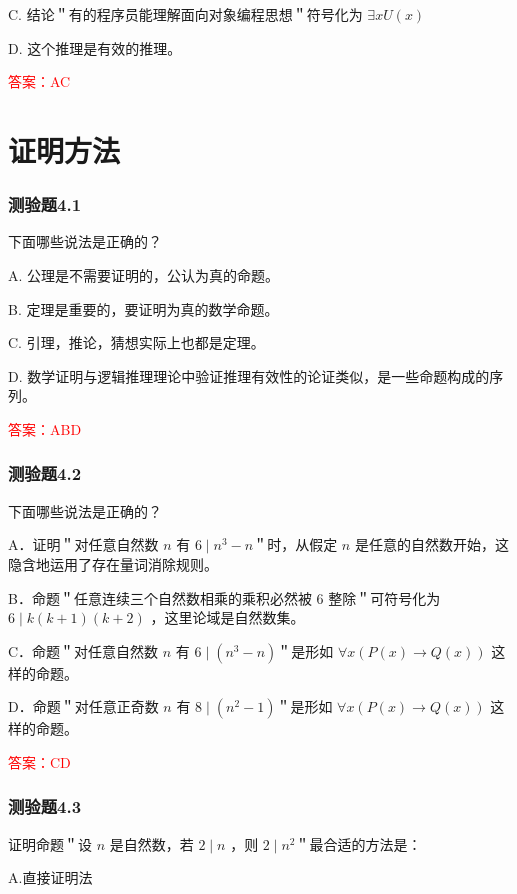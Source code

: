 \documentclass[UTF8, heading=true]{ctexart}
\begin{document}
C. 结论＂有的程序员能理解面向对象编程思想＂符号化为 $\exists x U(x)$

D. 这个推理是有效的推理。

\textcolor{red}{答案：AC}


\clearpage

\section{证明方法}

\subsubsection{测验题4.1}

下面哪些说法是正确的？

A. 公理是不需要证明的，公认为真的命题。

B. 定理是重要的，要证明为真的数学命题。

C. 引理，推论，猜想实际上也都是定理。

D. 数学证明与逻辑推理理论中验证推理有效性的论证类似，是一些命题构成的序列。


\textcolor{red}{答案：ABD}


\subsubsection{测验题4.2}

下面哪些说法是正确的？

A．证明＂对任意自然数 $n$ 有 $6 \mid n^3-n$＂时，从假定 $n$ 是任意的自然数开始，这隐含地运用了存在量词消除规则。

B．命题＂任意连续三个自然数相乘的乘积必然被 6 整除＂可符号化为 $6 \mid k(k+1)(k+2)$ ，这里论域是自然数集。

C．命题＂对任意自然数 $n$ 有 $6 \mid\left(n^3-n\right)$＂是形如 $\forall x(P(x) \rightarrow Q(x))$ 这样的命题。

D．命题＂对任意正奇数 $n$ 有 $8 \mid\left(n^2-1\right)$＂是形如 $\forall x(P(x) \rightarrow Q(x))$ 这样的命题。

\textcolor{red}{答案：CD}

\subsubsection{测验题4.3}

证明命题＂设 $n$ 是自然数，若 $2 \mid n$ ，则 $2 \mid n^2$＂最合适的方法是：

A.直接证明法
\end{document}
